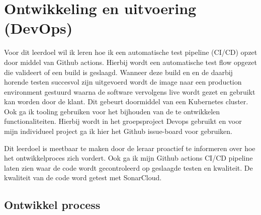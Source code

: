 
\section{Ontwikkeling en uitvoering (DevOps)}\label{sec:ontwikkeling-en-uitvoering-(devops)}


Voor dit leerdoel wil ik leren hoe ik een automatische test pipeline (CI/CD) opzet door middel van Github actions.
Hierbij wordt een automatische test flow opgezet die valideert of een build is geslaagd.
Wanneer deze build en en de daarbij horende testen succesvol zijn uitgevoerd wordt de image naar een production environment gestuurd waarna
de software vervolgens live wordt gezet en gebruikt kan worden door de klant.
Dit gebeurt doormiddel van een Kubernetes cluster.
Ook ga ik tooling gebruiken voor het bijhouden van de te ontwikkelen functionaliteiten.
Hierbij wordt in het groepsproject Devops gebruikt en voor mijn individueel project ga ik hier het Github issue-board voor gebruiken.

Dit leerdoel is meetbaar te maken door de leraar proactief te informeren over hoe het ontwikkelproces zich vordert.
Ook ga ik mijn Github actions CI/CD pipeline laten zien waar de code wordt gecontroleerd op geslaagde testen en kwaliteit.
De kwaliteit van de code word getest met SonarCloud.


\subsection{Ontwikkel process}
